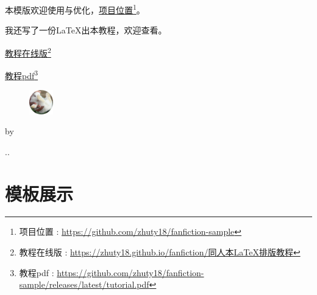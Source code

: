 \documentclass[10pt,openany]{book}
\newcommand{\signature}{
    \vfill
    \setstretch{1.5}

    \begin{figure}[h]
        \hfill\includegraphics[width=2.8em]{headshot.png}\hspace{5.1em}
    \end{figure}

    \vspace{-1.5em}

    \hfill by\bookauthor \hspace{5em}

    \hfill\number\year.\number\month.\number\day\hspace{4.8em}

    \vspace{2cm}
}
\newcommand{\link}[2]{\href{#1}{#2}\footnote{#2 : \href{#1}{#1}}}
\begin{document}
本模版欢迎使用与优化，\link{https://github.com/zhuty18/fanfiction-sample}{项目位置}。

我还写了一份\LaTeX 出本教程，欢迎查看。

\link{https://zhuty18.github.io/fanfiction/同人本LaTeX排版教程}{教程在线版}

\link{https://github.com/zhuty18/fanfiction-sample/releases/latest/tutorial.pdf}{教程pdf}

\signature

\part{模板展示}




\end{document}

